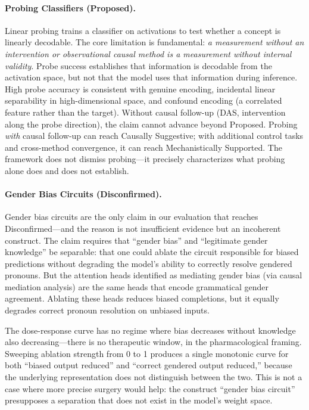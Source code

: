 \documentclass[10pt]{article}
\begin{document}
\paragraph{Probing Classifiers (Proposed).} Linear probing \citep{belinkov2022probing} trains a classifier on activations to test whether a concept is linearly decodable. The core limitation is fundamental: \emph{a measurement without an intervention or observational causal method is a measurement without internal validity}. Probe success establishes that information is decodable from the activation space, but not that the model uses that information during inference. High probe accuracy is consistent with genuine encoding, incidental linear separability in high-dimensional space, and confound encoding (a correlated feature rather than the target). Without causal follow-up (DAS, intervention along the probe direction), the claim cannot advance beyond Proposed. Probing \emph{with} causal follow-up can reach Causally Suggestive; with additional control tasks and cross-method convergence, it can reach Mechanistically Supported. The framework does not dismiss probing---it precisely characterizes what probing alone does and does not establish.

\paragraph{Gender Bias Circuits (Disconfirmed).} Gender bias circuits \citep{vig2020gender} are the only claim in our evaluation that reaches Disconfirmed---and the reason is not insufficient evidence but an incoherent construct. The claim requires that ``gender bias'' and ``legitimate gender knowledge'' be separable: that one could ablate the circuit responsible for biased predictions without degrading the model's ability to correctly resolve gendered pronouns. But the attention heads identified as mediating gender bias (via causal mediation analysis) are the same heads that encode grammatical gender agreement. Ablating these heads reduces biased completions, but it equally degrades correct pronoun resolution on unbiased inputs.

The dose-response curve has no regime where bias decreases without knowledge also decreasing---there is no therapeutic window, in the pharmacological framing. Sweeping ablation strength from 0 to 1 produces a single monotonic curve for both ``biased output reduced'' and ``correct gendered output reduced,'' because the underlying representation does not distinguish between the two. This is not a case where more precise surgery would help: the construct ``gender bias circuit'' presupposes a separation that does not exist in the model's weight space.
\end{document}
